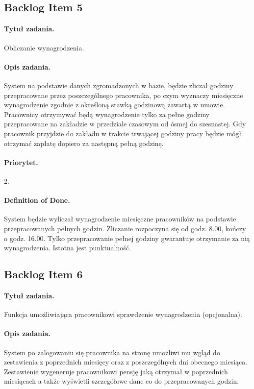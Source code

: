 \documentclass[a4paper]{article}
\begin{document}
\subsection{Backlog Item 5}
\paragraph{Tytuł zadania.} Obliczanie wynagrodzenia.
\paragraph{Opis zadania.} System na podstawie danych zgromadzonych w bazie, będzie zliczał godziny przepracowane przez poszczególnego pracownika, po czym wyznaczy miesięczne wynagrodzenie zgodnie z określoną stawką godzinową zawartą w umowie. Pracownicy otrzymywać będą wynagrodzenie tylko za pełne godziny przepracowane na zakładzie w przedziale czasowym od ósmej do szesnastej. Gdy pracownik przyjdzie do zakładu w trakcie trwającej godziny pracy będzie mógł otrzymać zapłatę dopiero za następną pełną godzinę.
\paragraph{Priorytet.} 2.
\paragraph{Definition of Done.} System będzie wyliczał wynagrodzenie miesięczne pracowników na podstawie przepracowanych pełnych godzin. Zliczanie rozpoczyna się od godz. 8.00, kończy o godz. 16.00. Tylko przepracowanie pełnej godziny gwarantuje otrzymanie za nią wynagrodzenia. Istotna jest punktualność.

\subsection{Backlog Item 6}
\paragraph{Tytuł zadania.} Funkcja umożliwiająca pracownikowi sprawdzenie wynagrodzenia (opcjonalna).
\paragraph{Opis zadania.} System po zalogowaniu się pracownika na stronę umożliwi mu wgląd do zestawienia z poprzednich miesięcy oraz z poszczególnych dni obecnego miesiąca. Zestawienie wygeneruje pracownikowi pensję jaką otrzymał w poprzednich miesiącach a także wyświetli szczegółowe dane co do przepracowanych godzin.
\end{document}
